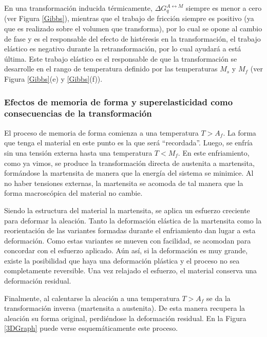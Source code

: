 \documentclass[12pt]{article}
\theoremstyle{definition}
\theoremstyle{remark}
\begin{document}
En una transformación inducida térmicamente, $\Delta G_{q}^{A \leftrightarrow M}$ siempre es menor a cero (ver Figura \ref{Gibbs}), mientras que el trabajo de fricción siempre es positivo (ya que es realizado sobre el volumen que transforma), por lo cual se opone al cambio de fase y es el responsable del efecto de histéresis en la transformación, el trabajo elástico es negativo durante la retransformación, por lo cual ayudará a está última. Este trabajo elástico es el responsable de que la transformación se desarrolle en el rango de temperatura definido por las temperaturas $M_s$ y $M_f$ (ver Figura \ref{Gibbs}(e) y \ref{Gibbs}(f)).


\subsubsection{Efectos de memoria de forma y superelasticidad como consecuencias de la transformación}

El proceso de memoria de forma comienza a una temperatura $T>A_f$. La forma que tenga el material en este punto es la que será ``recordada''. Luego, se enfría sin una tensión externa hasta una temperatura $T<M_f$. En este enfriamiento, como ya vimos, se produce la transformación directa de austenita a martensita, formándose la martensita de manera que la energía del sistema se minimice. Al no haber tensiones externas, la martensita se acomoda de tal manera que la forma macroscópica del material no cambie.

Siendo la estructura del material la martensita, se aplica un esfuerzo creciente para deformar la aleación. Tanto la deformación elástica de la martensita como la reorientación de las variantes formadas durante el enfriamiento dan lugar a esta deformación. Como estas variantes se mueven con facilidad, se acomodan para concordar con el esfuerzo aplicado. Aún así, si la deformación es muy grande, existe la posibilidad que haya una deformación plástica y el proceso no sea completamente reversible. Una vez relajado el esfuerzo, el material conserva una deformación residual.

Finalmente, al calentarse la aleación a una temperatura $T>A_f$ se da la transformación inversa (martensita a austenita). De esta manera recupera la aleación su forma original, perdiéndose la deformación residual. En la Figura \ref{3DGraph} puede verse esquemáticamente este proceso.
\end{document}
